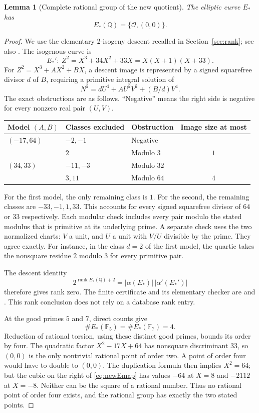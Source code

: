 \documentclass[11pt,letterpaper]{article}
\newtheorem{lemma}[theorem]{Lemma}
\theoremstyle{definition}\newtheorem{definition}[theorem]{Definition}
\theoremstyle{remark}\newtheorem{remark}[theorem]{Remark}
\newcommand{\Q}{\mathbb Q}\newcommand{\Z}{\mathbb Z}\newcommand{\R}{\mathbb R}
\newcommand{\F}{\mathbb F}\newcommand{\Pone}{\mathbf P^1}
\begin{document}
\begin{lemma}[Complete rational group of the new quotient]\label{lem:newE}
The elliptic curve $E_*$ has
\[
 E_*(\Q)=\{\mathcal O,(0,0)\}.
\]
\end{lemma}
\begin{proof}
We use the elementary 2-isogeny descent recalled in Section~\ref{sec:rank}; see also \cite{SageDescent}. The isogenous curve is
\[
 E_*':\ Z^2=X^3+34X^2+33X=X(X+1)(X+33).
\]
For $Z^2=X^3+AX^2+BX$, a descent image is represented by a signed squarefree divisor $d$ of $B$, requiring a primitive integral solution of
\[
 N^2=dU^4+AU^2V^2+(B/d)V^4.
\]
The exact obstructions are as follows. ``Negative'' means the right side is negative for every nonzero real pair $(U,V)$.
\begin{center}
\begin{tabular}{lllc}
\toprule
Model $(A,B)$ & Classes excluded & Obstruction & Image size at most\\
\midrule
$(-17,64)$ & $-2,-1$ & Negative & \\
 & $2$ & Modulo $3$ & $1$\\
$(34,33)$ & $-11,-3$ & Modulo $32$ & \\
 & $3,11$ & Modulo $64$ & $4$\\
\bottomrule
\end{tabular}
\end{center}
For the first model, the only remaining class is $1$. For the second, the remaining classes are $-33,-1,1,33$. This accounts for every signed squarefree divisor of $64$ or $33$ respectively. Each modular check includes every pair modulo the stated modulus that is primitive at its underlying prime. A separate check uses the two normalized charts: $V$ a unit, and $U$ a unit with $V/U$ divisible by the prime. They agree exactly. For instance, in the class $d=2$ of the first model, the quartic takes the nonsquare residue $2$ modulo $3$ for every primitive pair.

The descent identity
\[
 2^{\operatorname{rank}E_*(\Q)+2}
   =|\alpha(E_*)|\,|\alpha'(E_*')|
\]
therefore gives rank zero. The finite certificate and its elementary checker are  and . This rank conclusion does not rely on a database rank entry.

At the good primes $5$ and $7$, direct counts give
\[
 \#E_*(\F_5)=\#E_*(\F_7)=4.
\]
Reduction of rational torsion, using these distinct good primes, bounds its order by four. The quadratic factor $X^2-17X+64$ has nonsquare discriminant $33$, so $(0,0)$ is the only nontrivial rational point of order two. A point of order four would have to double to $(0,0)$. The duplication formula then implies $X^2=64$; but the cubic on the right of \eqref{eq:newEmap} has values $-64$ at $X=8$ and $-2112$ at $X=-8$. Neither can be the square of a rational number. Thus no rational point of order four exists, and the rational group has exactly the two stated points.
\end{proof}
\end{document}
